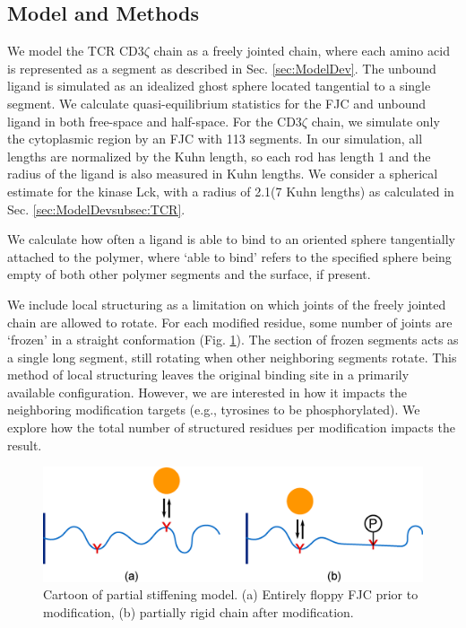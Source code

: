 \documentclass[../../AdvancementSummary.tex]{subfiles}
\begin{document}
\subsection{Model and Methods}

We model the TCR CD3$\zeta$ chain as a freely jointed chain, where each amino acid is represented as a segment as described in Sec. \ref{sec:ModelDev}. The unbound ligand is simulated as an idealized ghost sphere located tangential to a single segment. We calculate quasi-equilibrium statistics for the FJC and unbound ligand in both free-space and half-space. For the CD3$\zeta$ chain, we simulate only the cytoplasmic region by an FJC with 113 segments. In our simulation, all lengths are normalized by the Kuhn length, so each rod has length 1 and the radius of the ligand is also measured in Kuhn lengths. We consider a spherical estimate for the kinase Lck, with a radius of 2.1\nm (7 Kuhn lengths) as calculated in Sec. \ref{sec:ModelDevsubsec:TCR}.

We calculate how often a ligand is able to bind to an oriented sphere tangentially attached to the polymer, where `able to bind' refers to the specified sphere being empty of both other polymer segments and the surface, if present. 

We include local structuring as a limitation on which joints of the freely jointed chain are allowed to rotate. For each modified residue, some number of joints are `frozen' in a straight conformation (Fig. \ref{fig: StiffeningCartoon}). The section of frozen segments acts as a single long segment, still rotating when other neighboring segments rotate. This method of local structuring leaves the original binding site in a primarily available configuration. However, we are interested in how it impacts the neighboring modification targets (e.g., tyrosines to be phosphorylated). We explore how the total number of structured residues per modification impacts the result. 

\begin{figure}[H]
\begin{center}
    \includegraphics[width=0.8\linewidth]{ResultsFigures/StiffeningDiagram/StiffeningDiagram.eps}
    \caption{Cartoon of partial stiffening model. (a) Entirely floppy FJC prior to modification, (b) partially rigid chain after modification. \label{fig: StiffeningCartoon}}
    \end{center}
\end{figure}
\end{document}
